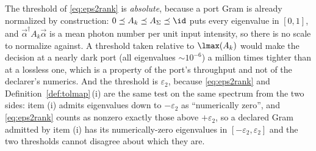 \begin{remark}
The threshold of \eqref{eq:eps2rank} is \emph{absolute}, because a port Gram is
already normalized by construction: $0\preceq A_k\preceq A_\Sigma\preceq\id$
puts every eigenvalue in $[0,1]$, and $\vec\alpha^\dagger A_k\vec\alpha$ is a
mean photon number per unit input intensity, so there is no scale to normalize
against. A threshold taken relative to $\lmax(A_k)$ would make the decision at
a nearly dark port (all eigenvalues $\sim10^{-6}$) a million times tighter than
at a lossless one, which is a property of the port's throughput and not of the
declarer's numerics. And the threshold is $\varepsilon_2$, because
\eqref{eq:eps2rank} and Definition~\ref{def:tolmap}\,(i) are the same test on
the same spectrum from the two sides: item (i) admits eigenvalues down to
$-\varepsilon_2$ as ``numerically zero'', and \eqref{eq:eps2rank} counts as
nonzero exactly those above $+\varepsilon_2$, so a declared Gram admitted by
item (i) has its numerically-zero eigenvalues in
$[-\varepsilon_2,\varepsilon_2]$ and the two thresholds cannot disagree about
which they are.
\end{remark}
